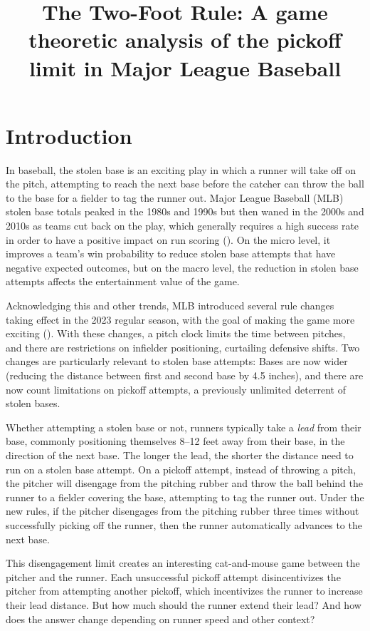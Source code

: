 \documentclass{article}
\title{The Two-Foot Rule: A game theoretic analysis of the pickoff limit in Major League Baseball}
\begin{document}
  \maketitle

  \section{Introduction}
  \label{sec:introduction}

    In baseball, the stolen base is an exciting play in which a runner will take off on the pitch, attempting to reach the next base before the catcher can throw the ball to the base for a fielder to tag the runner out. Major League Baseball (MLB) stolen base totals peaked in the 1980s and 1990s but then waned in the 2000s and 2010s as teams cut back on the play, which generally requires a high success rate in order to have a positive impact on run scoring (\cite{tango_book_2007}). On the micro level, it improves a team's win probability to reduce stolen base attempts that have negative expected outcomes, but on the macro level, the reduction in stolen base attempts affects the entertainment value of the game.

    Acknowledging this and other trends, MLB introduced several rule changes taking effect in the 2023 regular season, with the goal of making the game more exciting (\cite{castrovince_pitch_2023}). With these changes, a pitch clock limits the time between pitches, and there are restrictions on infielder positioning, curtailing defensive shifts. Two changes are particularly relevant to stolen base attempts: Bases are now wider (reducing the distance between first and second base by 4.5 inches), and there are now count limitations on pickoff attempts, a previously unlimited deterrent of stolen bases.
    
    Whether attempting a stolen base or not, runners typically take a {\it lead} from their base, commonly positioning themselves 8--12 feet away from their base, in the direction of the next base. The longer the lead, the shorter the distance need to run on a stolen base attempt. On a pickoff attempt, instead of throwing a pitch, the pitcher will disengage from the pitching rubber and throw the ball behind the runner to a fielder covering the base, attempting to tag the runner out. Under the new rules, if the pitcher disengages from the pitching rubber three times without successfully picking off the runner, then the runner automatically advances to the next base.

    This disengagement limit creates an interesting cat-and-mouse game between the pitcher and the runner. Each unsuccessful pickoff attempt disincentivizes the pitcher from attempting another pickoff, which incentivizes the runner to increase their lead distance. But how much should the runner extend their lead? And how does the answer change depending on runner speed and other context?
    
\end{document}
